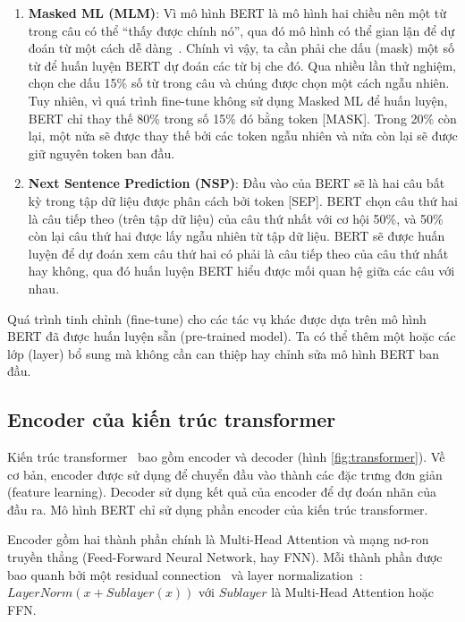 \begin{enumerate}
	\item \textbf{Masked ML (MLM)}:
		Vì mô hình BERT là mô hình hai chiều nên một từ trong câu có thể ``thấy
		được chính nó'', qua đó mô hình có thể gian lận để dự đoán từ một cách
		dễ dàng~\cite{devlinBERTPretrainingDeep2019}. Chính vì vậy, ta cần phải
		che dấu (mask) một số từ để huấn luyện BERT dự đoán các từ bị che đó.
		Qua nhiều lần thử nghiệm, \cite{devlinBERTPretrainingDeep2019} chọn che
		dấu 15\% số từ trong câu và chúng được chọn một cách ngẫu nhiên. Tuy
		nhiên, vì quá trình fine-tune không sử dụng Masked ML để huấn luyện,
		BERT chỉ thay thế 80\% trong số 15\% đó bằng token [MASK]. Trong 20\%
		còn lại, một nửa sẽ được thay thế bởi các token ngẫu nhiên và nửa còn
		lại sẽ được giữ nguyên token ban đầu.
	\item \textbf{Next Sentence Prediction (NSP)}: Đầu vào của BERT sẽ là hai
		câu bất kỳ trong tập dữ liệu được phân cách bởi token [SEP]. BERT chọn
		câu thứ hai là câu tiếp theo (trên tập dữ liệu) của câu thứ nhất với cơ
		hội 50\%, và 50\% còn lại câu thứ hai được lấy ngẫu nhiên từ tập dữ
		liệu. BERT sẽ được huấn luyện để dự đoán xem câu thứ hai có phải là câu
		tiếp theo của câu thứ nhất hay không, qua đó huấn luyện BERT hiểu được
		mối quan hệ giữa các câu với nhau.
\end{enumerate}

Quá trình tinh chỉnh (fine-tune) cho các tác vụ khác được dựa trên mô hình BERT
đã được huấn luyện sẵn (pre-trained model). Ta có thể thêm một hoặc các lớp
(layer) bổ sung mà không cần can thiệp hay chỉnh sửa mô hình BERT ban đầu.

\subsection{Encoder của kiến trúc transformer} Kiến trúc
transformer~\cite{vaswaniAttentionAllYou2017} bao gồm encoder và decoder
(hình \ref{fig:transformer}). Về cơ bản, encoder được sử dụng để chuyển đầu vào
thành các đặc trưng đơn giản (feature learning). Decoder sử dụng kết quả của
encoder để dự đoán nhãn của đầu ra. Mô hình BERT chỉ sử dụng phần encoder của
kiến trúc transformer.


Encoder gồm hai thành phần chính là Multi-Head Attention và mạng nơ-ron truyền
thẳng (Feed-Forward Neural Network, hay FNN). Mỗi thành phần được bao quanh bởi
một residual connection~\cite{heDeepResidualLearning2016} và layer
normalization~\cite{baLayerNormalization2016}: $LayerNorm(x + Sublayer(x))$ với
$Sublayer$ là Multi-Head Attention hoặc FFN.

